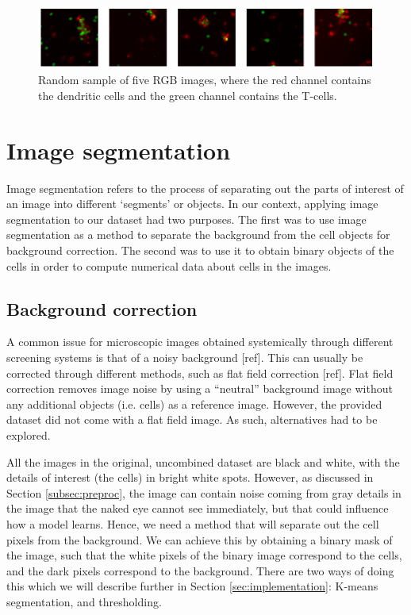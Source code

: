 \begin{figure}[h]
    \centering
    \includegraphics[width=\textwidth]{dissertation/figures/combined_cells.png}
    \caption{Random sample of five RGB images, where the red channel contains the dendritic cells and the green channel contains the T-cells.}
    \label{fig:combined}
\end{figure}

\section{Image segmentation}

Image segmentation refers to the process of separating out the parts of interest of an image into different `segments' or objects. In our context, applying image segmentation to our dataset had two purposes. The first was to use image segmentation as a method to separate the background from the cell objects for background correction. The second was to use it to obtain binary objects of the cells in order to compute numerical data about cells in the images.

\subsection{Background correction} \label{subsec:correction}

A common issue for microscopic images obtained systemically through different screening systems is that of a noisy background [ref]. This can usually be corrected through different methods, such as flat field correction [ref]. Flat field correction removes image noise by using a ``neutral” background image without any additional objects (i.e. cells) as a reference image. However, the provided dataset did not come with a flat field image. As such, alternatives had to be explored.

All the images in the original, uncombined dataset are black and white, with the details of interest (the cells) in bright white spots. However, as discussed in Section \ref{subsec:preproc}, the image can contain noise coming from gray details in the image that the naked eye cannot see immediately, but that could influence how a model learns. Hence, we need a method that will separate out the cell pixels from the background. We can achieve this by obtaining a binary mask of the image, such that the white pixels of the binary image correspond to the cells, and the dark pixels correspond to the background. There are two ways of doing this which we will describe further in Section \ref{sec:implementation}: K-means segmentation, and thresholding.

